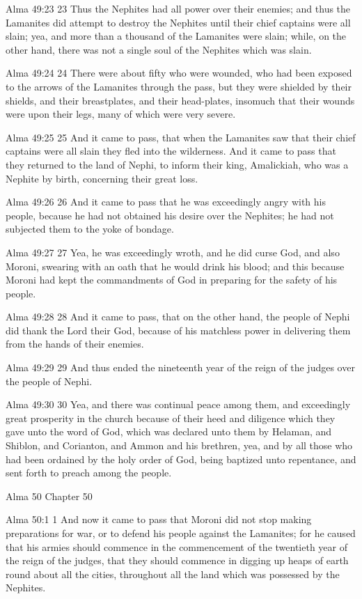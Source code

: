 Alma 49:23
 23 Thus the Nephites had all power over their enemies; and thus
the Lamanites did attempt to destroy the Nephites until their
chief captains were all slain; yea, and more than a thousand of
the Lamanites were slain; while, on the other hand, there was not
a single soul of the Nephites which was slain.

Alma 49:24
 24 There were about fifty who were wounded, who had been exposed
to the arrows of the Lamanites through the pass, but they were
shielded by their shields, and their breastplates, and their
head-plates, insomuch that their wounds were upon their legs,
many of which were very severe.

Alma 49:25
 25 And it came to pass, that when the Lamanites saw that their
chief captains were all slain they fled into the wilderness. And
it came to pass that they returned to the land of Nephi, to
inform their king, Amalickiah, who was a Nephite by birth,
concerning their great loss.

Alma 49:26
 26 And it came to pass that he was exceedingly angry with his
people, because he had not obtained his desire over the Nephites;
he had not subjected them to the yoke of bondage.

Alma 49:27
 27 Yea, he was exceedingly wroth, and he did curse God, and also
Moroni, swearing with an oath that he would drink his blood; and
this because Moroni had kept the commandments of God in preparing
for the safety of his people.

Alma 49:28
 28 And it came to pass, that on the other hand, the people of
Nephi did thank the Lord their God, because of his matchless
power in delivering them from the hands of their enemies.

Alma 49:29
 29 And thus ended the nineteenth year of the reign of the judges
over the people of Nephi.

Alma 49:30
 30 Yea, and there was continual peace among them, and
exceedingly great prosperity in the church because of their heed
and diligence which they gave unto the word of God, which was
declared unto them by Helaman, and Shiblon, and Corianton, and
Ammon and his brethren, yea, and by all those who had been
ordained by the holy order of God, being baptized unto
repentance, and sent forth to preach among the people.

Alma 50
Chapter 50

Alma 50:1
 1 And now it came to pass that Moroni did not stop making
preparations for war, or to defend his people against the
Lamanites; for he caused that his armies should commence in the
commencement of the twentieth year of the reign of the judges,
that they should commence in digging up heaps of earth round
about all the cities, throughout all the land which was possessed
by the Nephites.

